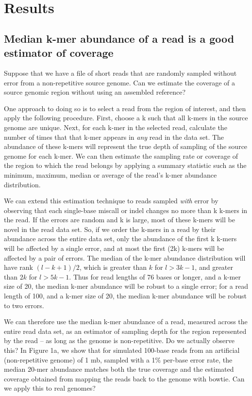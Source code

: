 \documentclass[10pt]{article}
\begin{document}
\section*{Results}

\subsection*{Median k-mer abundance of a read is a good estimator of coverage}

Suppose that we have a file of short reads that are randomly sampled
without error from a non-repetitive source genome.  Can we estimate
the coverage of a source genomic region without using an assembled
reference?

One approach to doing so is to select a read from the region of
interest, and then apply the following procedure. First, choose a k
such that all k-mers in the source genome are unique.  Next, for each
k-mer in the selected read, calculate the number of times that that
k-mer appears in {\em any} read in the data set.  The abundance of
these k-mers will represent the true depth of sampling of the source
genome for each k-mer.  We can then estimate the sampling rate or
coverage of the region to which the read belongs by applying a summary
statistic such as the minimum, maximum, median or average of the
read's k-mer abundance distribution.

We can extend this estimation technique to reads sampled {\em with}
error by observing that each single-base miscall or indel changes no
more than k k-mers in the read.  If the errors are random and k is
large, most of these k-mers will be novel in the read data set.  So,
if we order the k-mers in a read by their abundance across the entire
data set, only the abundance of the first k k-mers will be affected by
a single error, and at most the first (2k) k-mers will be affected by
a pair of errors.  The median of the k-mer abundance distribution will
have rank $(l - k + 1) / 2$, which is greater than $k$ for $l > 3k-1$,
and greater than $2k$ for $l > 5k-1$.  Thus for read lengths of 76
bases or longer, and a k-mer size of 20, the median k-mer abundance
will be robust to a single error; for a read length of 100, and a
k-mer size of 20, the median k-mer abundance will be robust to two
errors.

We can therefore use the median k-mer abundance of a read, measured
across the entire read data set, as an estimator of sampling depth for
the region represented by the read -- as long as the genome is
non-repetitive.  Do we actually observe this?  In Figure 1a, we show
that for simulated 100-base reads from an artificial (non-repetitive
genome) of 1 mb, sampled with a 1\% per-base error rate, the median
20-mer abundance matches both the true coverage and the estimated
coverage obtained from mapping the reads back to the genome with
bowtie.  Can we apply this to real genomes?
\end{document}
